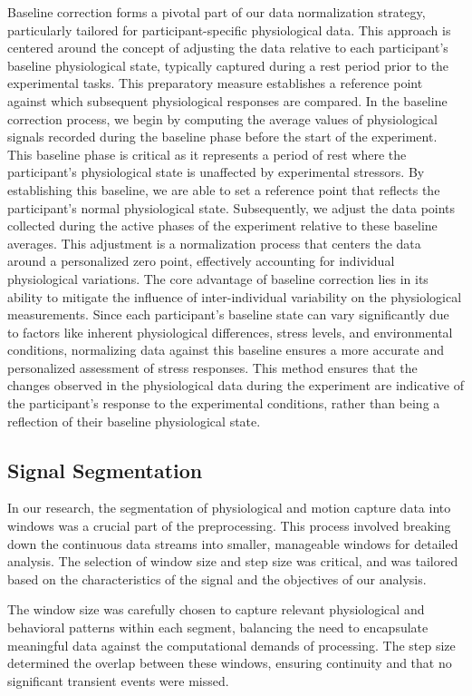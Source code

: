 Baseline correction forms a pivotal part of our data normalization strategy, particularly tailored for participant-specific physiological data. This approach is centered around the concept of adjusting the data relative to each participant's baseline physiological state, typically captured during a rest period prior to the experimental tasks. This preparatory measure establishes a reference point against which subsequent physiological responses are compared.
In the baseline correction process, we begin by computing the average values of physiological signals recorded during the baseline phase before the start of the experiment. This baseline phase is critical as it represents a period of rest where the participant's physiological state is unaffected by experimental stressors. By establishing this baseline, we are able to set a reference point that reflects the participant's normal physiological state. Subsequently, we adjust the data points collected during the active phases of the experiment relative to these baseline averages. This adjustment is a normalization process that centers the data around a personalized zero point, effectively accounting for individual physiological variations. The core advantage of baseline correction lies in its ability to mitigate the influence of inter-individual variability on the physiological measurements. Since each participant's baseline state can vary significantly due to factors like inherent physiological differences, stress levels, and environmental conditions, normalizing data against this baseline ensures a more accurate and personalized assessment of stress responses.
This method ensures that the changes observed in the physiological data during the experiment are indicative of the participant's response to the experimental conditions, rather than being a reflection of their baseline physiological state.

\subsection*{Signal Segmentation}
\label{sec:signal_segmentation}
In our research, the segmentation of physiological and motion capture data into windows was a crucial part of the preprocessing. This process involved breaking down the continuous data streams into smaller, manageable windows for detailed analysis. The selection of window size and step size was critical, and was tailored based on the characteristics of the signal and the objectives of our analysis.

The window size was carefully chosen to capture relevant physiological and behavioral patterns within each segment, balancing the need to encapsulate meaningful data against the computational demands of processing. The step size determined the overlap between these windows, ensuring continuity and that no significant transient events were missed.

